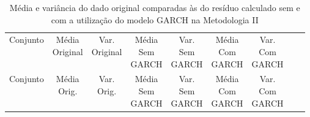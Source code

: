 \clearpage

\begin{center}
\begin{longtable}{ccccccccc}
\toprule
\rowcolor{white}
\caption[Metodologia II: dados estatísticos]{Média e variância do dado original
comparadas às do resíduo calculado sem e com a utilização do modelo GARCH na
Metodologia II} \label{tab:DadosEstatisticosMet2}\\
\midrule
    Conjunto & \specialcell{Média\\Original} &
    \specialcell{Var.\\Original} & \specialcell{Média\\Sem\\GARCH} &
    \specialcell{Var.\\Sem\\GARCH} & \specialcell{Média\\Com\\GARCH}&
    \specialcell{Var.\\Com\\GARCH} \\

\midrule
\endfirsthead 
\midrule
\rowcolor{white}
    Conjunto & \specialcell{Média\\Orig.} &
    \specialcell{Var.\\Orig.} & \specialcell{Média\\Sem\\GARCH} &
    \specialcell{Var.\\Sem\\GARCH} & \specialcell{Média\\Com\\GARCH}&
    \specialcell{Var.\\Com\\GARCH} \\


\end{longtable}
\end{center}
